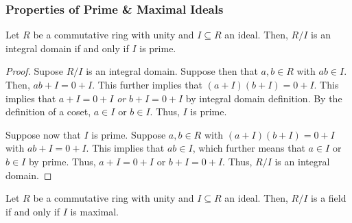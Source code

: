 \documentclass[letterpaper]{article}
\begin{document}
\subsubsection{Properties of Prime \& Maximal Ideals}
\begin{theorem}{}{}
    Let $R$ be a commutative ring with unity and $I \subseteq R$ an ideal. Then, $R / I$ is an integral domain if and only if $I$ is prime. 
\end{theorem}

\begin{mdframed}[]
    \begin{proof}
        Supose $R / I$ is an integral domain. Suppose then that $a, b \in R$ with $ab \in I$. Then, $ab + I = 0 + I$. This further implies that $(a + I)(b + I) = 0 + I$. This implies that $a + I = 0 + I$ \emph{or} $b + I = 0 + I$ by integral domain definition. By the definition of a coset, $a \in I$ or $b \in I$. Thus, $I$ is prime. 
        
        \bigskip

        Suppose now that $I$ is prime. Suppose $a, b \in R$ with $(a + I)(b + I) = 0 + I$ with $ab + I = 0 + I$. This implies that $ab \in I$, which further means that $a \in I$ or $b \in I$ by prime. Thus, $a + I = 0 + I$ or $b + I = 0 + I$. Thus, $R / I$ is an integral domain.
    \end{proof}
\end{mdframed}

\begin{theorem}{}{}
    Let $R$ be a commutative ring with unity and $I \subseteq R$ an ideal. Then, $R / I$ is a field if and only if $I$ is maximal.
\end{theorem}
\end{document}
